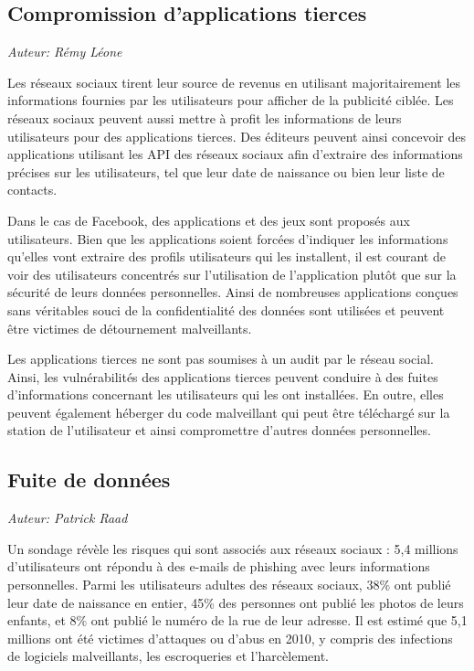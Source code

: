 \subsection{Compromission d'applications tierces}

\begin{flushright}\textit{Auteur: Rémy Léone}\end{flushright}

Les réseaux sociaux tirent leur source de revenus en utilisant majoritairement
les informations fournies par les utilisateurs pour afficher de la publicité
ciblée. Les réseaux sociaux peuvent aussi mettre à profit les informations de
leurs utilisateurs pour des applications tierces. Des éditeurs peuvent ainsi
concevoir des applications utilisant les API des réseaux sociaux afin d'extraire
des informations précises sur les utilisateurs, tel que leur date de naissance
ou bien leur liste de contacts.

Dans le cas de Facebook, des applications et des jeux sont proposés aux
utilisateurs. Bien que les applications soient forcées d'indiquer les
informations qu'elles vont extraire des profils utilisateurs qui les installent,
il est courant de voir des utilisateurs concentrés sur l'utilisation de
l'application plutôt que sur la sécurité de leurs données personnelles.  Ainsi
de nombreuses applications conçues sans véritables souci de la confidentialité
des données sont utilisées et peuvent être victimes de détournement
malveillants.

Les applications tierces ne sont pas soumises à un audit par le réseau social.
Ainsi, les vulnérabilités des applications tierces peuvent conduire à des fuites
d'informations concernant les utilisateurs qui les ont installées. En outre,
elles peuvent également héberger du code malveillant qui peut être téléchargé
sur la station de l'utilisateur et ainsi compromettre d'autres données
personnelles.

\subsection{Fuite de données}

\begin{flushright}\textit{Auteur: Patrick Raad}\end{flushright}

Un sondage révèle les risques qui sont associés aux réseaux sociaux
\cite{poll-dataleak}: 5,4 millions d’utilisateurs ont répondu à des e-mails de
phishing avec leurs informations personnelles. Parmi les utilisateurs adultes
des réseaux sociaux, 38\% ont publié leur date de naissance en entier, 45\% des
personnes ont publié les photos de leurs enfants, et 8\% ont publié le numéro de
la rue de leur adresse. Il est estimé que 5,1 millions ont été victimes
d'attaques ou d'abus en 2010, y compris des infections de logiciels
malveillants, les escroqueries et l’harcèlement.

